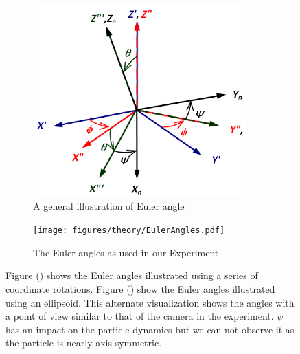 \begin{figure}[H]
\centering
\begin{subfigure}[b]{0.45\textwidth}
\includegraphics[width=0.9\textwidth]{figures/theory/eulerangles.png}
\caption{A general illustration of Euler angle}
\label{fig:eulerangles}
\end{subfigure}
\begin{subfigure}[b]{0.45\textwidth}
\texttt{[image: figures/theory/EulerAngles.pdf]}
\caption{The Euler angles as used in our Experiment}
\label{fig:eulerparticle}
\end{subfigure}
\caption{Figure () shows the Euler angles illustrated using a series of coordinate rotations. 
Figure () show the Euler angles illustrated using an ellipsoid. This alternate visualization shows the angles with a point of view similar to that of the camera in the experiment. $\psi$ has an impact on the particle dynamics but we can not observe it as the particle is nearly axis-symmetric.}\label{fig:eulerplots}
\end{figure}


%
%

